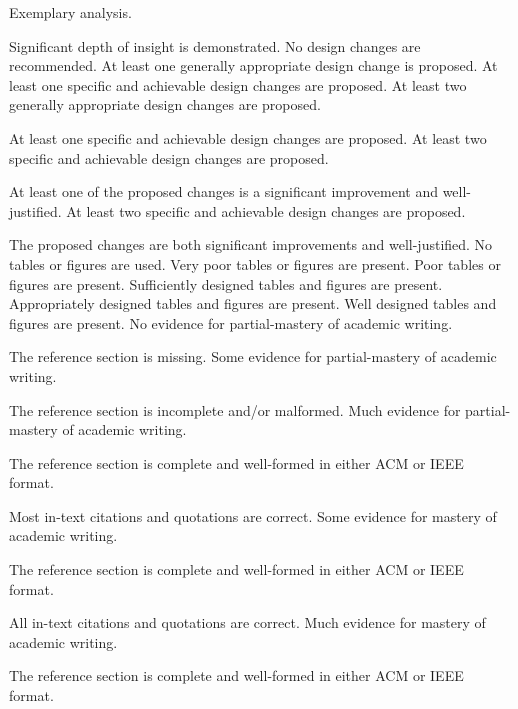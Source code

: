 \documentclass{../fal_assignment}
\begin{document}
\begin{markingrubric}
        \grade 		Exemplary analysis.
        \par 		Significant depth of insight is demonstrated.
%
        \grade\fail 	No design changes are recommended.
        \grade 		At least one generally appropriate design change is proposed.
        \grade 		At least one specific and achievable design changes are proposed. 
        \grade 		At least two generally appropriate design changes are proposed.
        \par  		At least one specific and achievable design changes are proposed. 
        \grade 		At least two specific and achievable design changes are proposed. 
        \par  		At least one of the proposed changes is a significant improvement and well-justified.
        \grade 		At least two specific and achievable design changes are proposed. 
        \par  		The proposed changes are both significant improvements and well-justified.
%
        \grade\fail 	No tables or figures are used.
        \grade 		Very poor tables or figures are present.
        \grade 		Poor tables or figures are present. 
        \grade 		Sufficiently designed tables and figures are present. 
        \grade 		Appropriately designed tables and figures are present.
        \grade 		Well designed tables and figures are present. 
%
        \grade\fail 	No evidence for partial-mastery of academic writing.
        \par 		The reference section is missing.
        \grade 		Some evidence for partial-mastery of academic writing.
        \par 		The reference section is incomplete and/or malformed.
        \grade 		Much evidence for partial-mastery of academic writing.
        \par 		The reference section is complete and well-formed in either ACM or IEEE format.
        \par 		Most in-text citations and quotations are correct.
        \grade 		Some evidence for mastery of academic writing.
        \par 		The reference section is complete and well-formed in either ACM or IEEE format.
        \par 		All in-text citations and quotations are correct.
        \grade 		Much evidence for mastery of academic writing.
        \par 		The reference section is complete and well-formed in either ACM or IEEE format.

\end{markingrubric}
\end{document}
